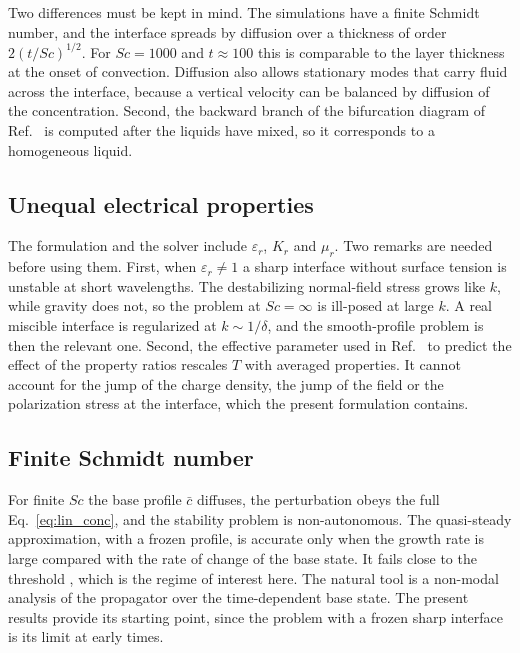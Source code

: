 \documentclass[aip,pof,reprint,amsmath,amssymb]{revtex4-2}
\begin{document}
Two differences must be kept in mind. The simulations have a finite Schmidt number, and
the interface spreads by diffusion over a thickness of order $2(t/Sc)^{1/2}$. For
$Sc=1000$ and $t\approx100$ this is comparable to the layer thickness at the onset of
convection. Diffusion also allows stationary modes that carry fluid across the interface,
because a vertical velocity can be balanced by diffusion of the concentration. Second, the
backward branch of the bifurcation diagram of Ref.~ is computed
after the liquids have mixed, so it corresponds to a homogeneous liquid.

\subsection{Unequal electrical properties}

The formulation and the solver include $\varepsilon_r$, $K_r$ and $\mu_r$. Two remarks are
needed before using them. First, when $\varepsilon_r\ne1$ a sharp interface without surface
tension is unstable at short wavelengths. The destabilizing normal-field stress grows like
$k$, while gravity does not, so the problem at $Sc=\infty$ is ill-posed at large $k$. A
real miscible interface is regularized at $k\sim1/\delta$, and the smooth-profile problem
is then the relevant one. Second, the effective parameter used in
Ref.~ to predict the effect of the property ratios rescales $T$ with
averaged properties. It cannot account for the jump of the charge density, the jump of
the field or the polarization stress at the interface, which the present formulation
contains.

\subsection{Finite Schmidt number}

For finite $Sc$ the base profile $\bar c$ diffuses, the perturbation obeys the full
Eq.~\eqref{eq:lin_conc}, and the stability problem is non-autonomous. The quasi-steady approximation, with a frozen profile, is accurate only
when the growth rate is large compared with the rate of change of the base state. It fails
close to the threshold \cite{TanHomsy1986,Riaz2006}, which is the regime of interest here.
The natural tool is a non-modal analysis of the propagator over the time-dependent base
state. The present results provide its starting point, since the problem with a frozen
sharp interface is its limit at early times.
\end{document}
